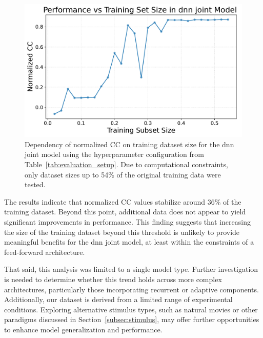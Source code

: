 \begin{figure}
    \centering
    \includegraphics[width=0.8\linewidth]{img/plots/train_size_performance_dependency.pdf}
    \caption{Dependency of normalized CC on training dataset size for the dnn joint model using the hyperparameter configuration from Table~\ref{tab:evaluation_setup}. Due to computational constraints, only dataset sizes up to 54\% of the original training data were tested.}
    \label{fig:train_size_cc_norm_dependency}
\end{figure}

The results indicate that normalized CC values stabilize around 36\% of the training dataset. Beyond this point, additional data does not appear to yield significant improvements in performance. This finding suggests that increasing the size of the training dataset beyond this threshold is unlikely to provide meaningful benefits for the dnn joint model, at least within the constraints of a feed-forward architecture.

That said, this analysis was limited to a single model type. Further investigation is needed to determine whether this trend holds across more complex architectures, particularly those incorporating recurrent or adaptive components. Additionally, our dataset is derived from a limited range of experimental conditions. Exploring alternative stimulus types, such as natural movies or other paradigms discussed in Section~\ref{subsec:stimulus}, may offer further opportunities to enhance model generalization and performance.
